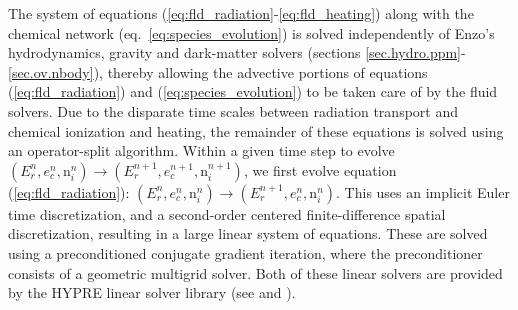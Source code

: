 The system of equations
(\ref{eq:fld_radiation}-\ref{eq:fld_heating}) along with the chemical network 
(eq.~\ref{eq:species_evolution}) is solved
independently of Enzo's hydrodynamics, gravity and dark-matter solvers
(sections \ref{sec.hydro.ppm}-\ref{sec.ov.nbody}), thereby allowing
the advective portions of equations (\ref{eq:fld_radiation}) and
(\ref{eq:species_evolution}) to be taken care of by the fluid solvers.
Due to the disparate time scales between radiation transport and chemical
ionization and heating, the remainder of these equations is solved
using an operator-split algorithm.  Within a given time step to evolve
$(E_r^n, e_c^n, {\mathrm n}_i^n) \to (E_r^{n+1}, e_c^{n+1}, {\mathrm
n}_i^{n+1})$, we first evolve equation (\ref{eq:fld_radiation}):
$(E_r^n, e_c^n, {\mathrm n}_i^n) \to (E_r^{n+1}, e_c^{n}, {\mathrm
  n}_i^{n})$.  This uses an implicit Euler time discretization, and a
second-order centered finite-difference spatial discretization,
resulting in a large linear system of equations.  These are solved
using a preconditioned conjugate gradient iteration, where the
preconditioner consists of a geometric multigrid solver.  Both of
these linear solvers are provided by the HYPRE linear solver library
(see \cite{FalgoutYang2002} and \cite{hypre-manual}). 

